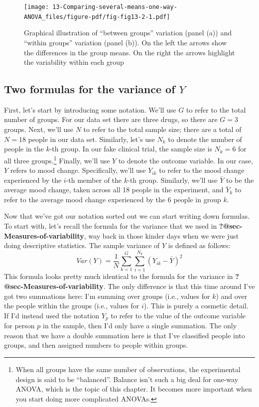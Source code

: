 \documentclass[
  a4paper,
]{book}
\begin{document}
\begin{figure}

\texttt{[image: 13-Comparing-several-means-one-way-ANOVA\_files/figure-pdf/fig-fig13-2-1.pdf]} \hfill{}

\caption{\label{fig-fig13-2}Graphical illustration of ``between groups''
variation (panel (a)) and ``within groups'' variation (panel (b)). On
the left the arrows show the differences in the group means. On the
right the arrows highlight the variability within each group}

\end{figure}

\hypertarget{two-formulas-for-the-variance-of-y}{%
\subsection{\texorpdfstring{Two formulas for the variance of
\(Y\)}{Two formulas for the variance of Y}}\label{two-formulas-for-the-variance-of-y}}

First, let's start by introducing some notation. We'll use \(G\) to
refer to the total number of groups. For our data set there are three
drugs, so there are \(G = 3\) groups. Next, we'll use \(N\) to refer to
the total sample size; there are a total of \(N = 18\) people in our
data set. Similarly, let's use \(N_k\) to denote the number of people in
the \(k\)-th group. In our fake clinical trial, the sample size is
\(N_k = 6\) for all three groups.\footnote{When all groups have the same
  number of observations, the experimental design is said to be
  ``balanced''. Balance isn't such a big deal for one-way ANOVA, which
  is the topic of this chapter. It becomes more important when you start
  doing more complicated ANOVAs.} Finally, we'll use \(Y\) to denote the
outcome variable. In our case, \(Y\) refers to mood change.
Specifically, we'll use \(Y_{ik}\) to refer to the mood change
experienced by the \(i\)-th member of the \(k\)-th group. Similarly,
we'll use \(\bar{Y}\) to be the average mood change, taken across all 18
people in the experiment, and \(\bar{Y}_k\) to refer to the average mood
change experienced by the 6 people in group \(k\).

Now that we've got our notation sorted out we can start writing down
formulas. To start with, let's recall the formula for the variance that
we used in \textbf{?@sec-Measures-of-variability}, way back in those
kinder days when we were just doing descriptive statistics. The sample
variance of \(Y\) is defined as follows:
\[Var(Y)=\frac{1}{N}\sum_{k=1}^{G}\sum_{i=1}^{N_k}(Y_{ik}-\bar{Y})^2\]
This formula looks pretty much identical to the formula for the variance
in \textbf{?@sec-Measures-of-variability}. The only difference is that
this time around I've got two summations here: I'm summing over groups
(i.e., values for \(k\)) and over the people within the groups (i.e.,
values for \(i\)). This is purely a cosmetic detail. If I'd instead used
the notation \(Y_p\) to refer to the value of the outcome variable for
person \(p\) in the sample, then I'd only have a single summation. The
only reason that we have a double summation here is that I've classified
people into groups, and then assigned numbers to people within groups.
\end{document}
